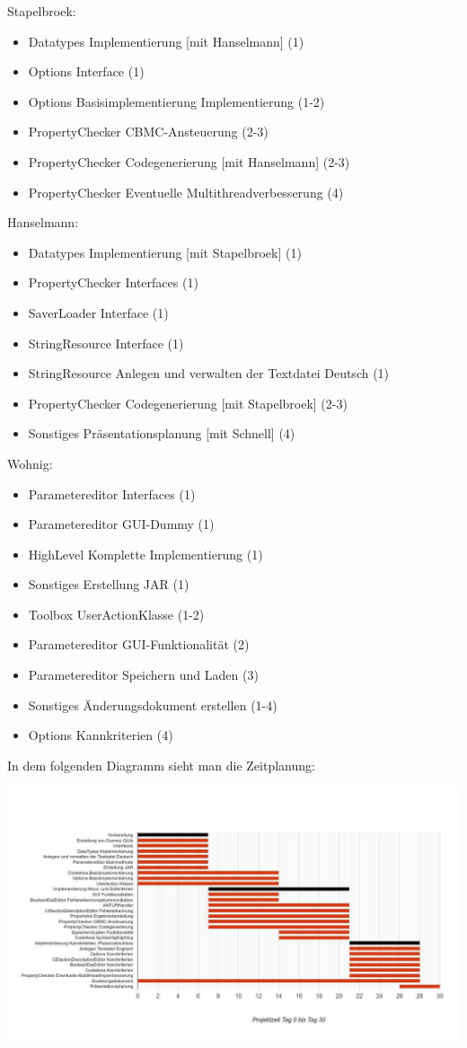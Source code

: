 \documentclass[a4paper]{scrreprt}
\begin{document}
\vspace{8mm}
Stapelbroek:
\begin{itemize}
\item Datatypes Implementierung [mit Hanselmann] (1)
\item Options Interface (1)
\item Options Basisimplementierung Implementierung (1-2)
\item PropertyChecker CBMC-Ansteuerung (2-3) 
\item PropertyChecker Codegenerierung [mit Hanselmann] (2-3) 
\item PropertyChecker Eventuelle Multithreadverbesserung (4)
\end{itemize}
\vspace{8mm}
Hanselmann:
\begin{itemize}
\item Datatypes Implementierung [mit Stapelbroek] (1)
\item PropertyChecker Interfaces (1)
\item SaverLoader Interface (1)
\item StringResource Interface (1)
\item StringResource Anlegen und verwalten der Textdatei Deutsch (1)
\item PropertyChecker Codegenerierung [mit Stapelbroek] (2-3)
\item Sonstiges Präsentationsplanung [mit Schnell] (4)
\end{itemize}
\vspace{8mm}
Wohnig:
\begin{itemize}
\item Parametereditor Interfaces (1)
\item Parametereditor GUI-Dummy (1)
\item HighLevel Komplette Implementierung (1)
\item Sonstiges Erstellung JAR (1)
\item Toolbox UserActionKlasse (1-2)
\item Parametereditor GUI-Funktionalität (2)
\item Parametereditor Speichern und Laden (3)
\item Sonstiges Änderungsdokument erstellen (1-4)
\item Options Kannkriterien (4)
\end{itemize}
\vspace{8mm}
In dem folgenden Diagramm sieht man die Zeitplanung: \\
\begin{landscape}
\includegraphics[width=1.4\textwidth] {planung.jpg}
\end{landscape}
\end{document}
